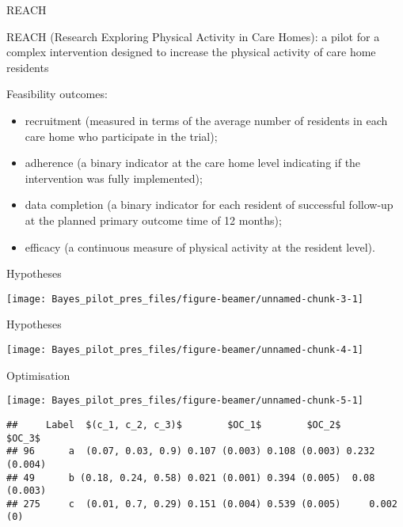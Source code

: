 \documentclass[
  ignorenonframetext,
]{beamer}
\providecommand{\tightlist}{%
  \setlength{\itemsep}{0pt}\setlength{\parskip}{0pt}}
\begin{document}
\begin{frame}{REACH}
\protect\hypertarget{reach}{}

REACH (Research Exploring Physical Activity in Care Homes): a pilot for
a complex intervention designed to increase the physical activity of
care home residents

Feasibility outcomes:

\begin{itemize}
\tightlist
\item
  recruitment (measured in terms of the average number of residents in
  each care home who participate in the trial);
\item
  adherence (a binary indicator at the care home level indicating if the
  intervention was fully implemented);
\item
  data completion (a binary indicator for each resident of successful
  follow-up at the planned primary outcome time of 12 months);
\item
  efficacy (a continuous measure of physical activity at the resident
  level).
\end{itemize}

\end{frame}

\begin{frame}{Hypotheses}
\protect\hypertarget{hypotheses-1}{}

\texttt{[image: Bayes\_pilot\_pres\_files/figure-beamer/unnamed-chunk-3-1]}

\end{frame}

\begin{frame}{Hypotheses}
\protect\hypertarget{hypotheses-2}{}

\texttt{[image: Bayes\_pilot\_pres\_files/figure-beamer/unnamed-chunk-4-1]}

\end{frame}

\begin{frame}[fragile]{Optimisation}
\protect\hypertarget{optimisation}{}

\texttt{[image: Bayes\_pilot\_pres\_files/figure-beamer/unnamed-chunk-5-1]}

\begin{verbatim}
##     Label  $(c_1, c_2, c_3)$        $OC_1$        $OC_2$        $OC_3$
## 96      a  (0.07, 0.03, 0.9) 0.107 (0.003) 0.108 (0.003) 0.232 (0.004)
## 49      b (0.18, 0.24, 0.58) 0.021 (0.001) 0.394 (0.005)  0.08 (0.003)
## 275     c  (0.01, 0.7, 0.29) 0.151 (0.004) 0.539 (0.005)     0.002 (0)
\end{verbatim}

\end{frame}
\end{document}
